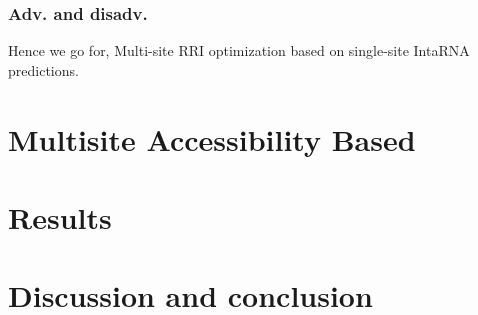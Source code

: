 \documentclass[twoside,a4paper]{report}
\begin{document}
	\subsection{Adv. and disadv.}
		Hence we go for, Multi-site RRI optimization based on single-site IntaRNA predictions.
		
	\chapter{Multisite Accessibility Based  }
	\chapter{Results}
	\chapter{Discussion and conclusion}
	
	
	
	

	
\end{document}
